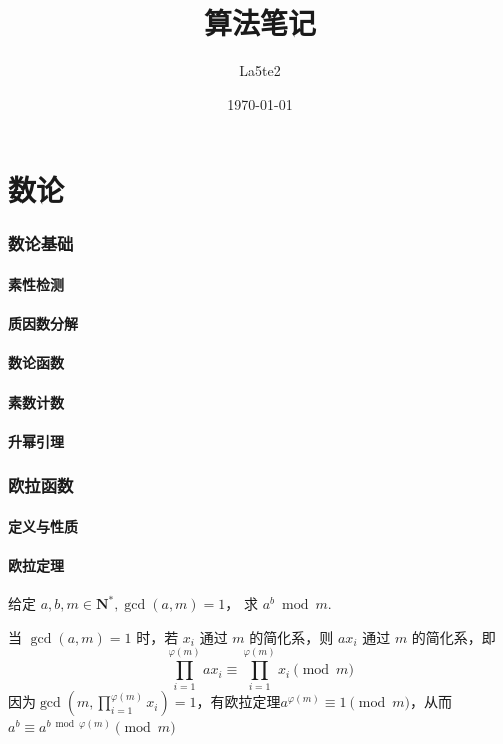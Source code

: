 \documentclass[12pt,a4paper]{article}
\title{算法笔记}
\author{La5te2}
\date{\today}
\begin{document}
	
\maketitle
\setcounter{tocdepth}{2}
\tableofcontents
\makeatletter
{} %
\makeatother
\graphicspath{{image/}}


\newpage
\part{数论}
\section{数论基础}
\subsection{素性检测}
\subsection{质因数分解}
\subsection{数论函数}
\subsection{素数计数} %
\subsection{升幂引理}

\newpage
\section{欧拉函数}
\subsection{定义与性质}
\subsection{欧拉定理}
\begin{mdframed}[leftline=true, linewidth=2pt, linecolor=gray]
	给定 $a,b,m\in \mathbf{N^*},\gcd(a,m)=1$， 求 $a^b\bmod{m}$.
\end{mdframed}
当 $\gcd(a,m)=1$ 时，若 $x_i$ 通过 $m$ 的简化系，则 $ax_i$ 通过 $m$ 的简化系，即\begin{equation*}
	\displaystyle\prod^{\varphi(m)}_{i=1}ax_i\equiv\prod^{\varphi(m)}_{i=1}x_i\pmod{m}
\end{equation*}
因为$\displaystyle\gcd(m,\prod^{\varphi(m)}_{i=1}x_i)=1$，有欧拉定理$a^{\varphi(m)}\equiv1\pmod{m}$，从而 $a^b\equiv a^{b\bmod{\varphi(m)}}\pmod{m}$
\end{document}

